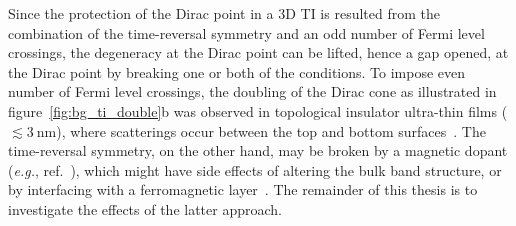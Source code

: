 Since the protection of the Dirac point in a 3D TI is resulted from the combination of the time-reversal symmetry and an odd number of Fermi level crossings, the degeneracy at the Dirac point can be lifted, hence a gap opened, at the Dirac point by breaking one or both of the conditions. To impose even number of Fermi level crossings, the doubling of the Dirac cone as illustrated in figure~\ref{fig:bg_ti_double}b was observed in topological insulator ultra-thin films ($\lesssim 3~\mathrm{nm}$), where scatterings occur between the top and bottom surfaces~\cite{ARPES_thickness}. The time-reversal symmetry, on the other hand, may be broken by a magnetic dopant (\textit{e.g.}, ref.~\cite{Chang2013}), which might have side effects of altering the bulk band structure, or by interfacing with a ferromagnetic layer~\cite{TI_Col, QAH_TI_Yu, MnSe}. The remainder of this thesis is to investigate the effects of the latter approach.
